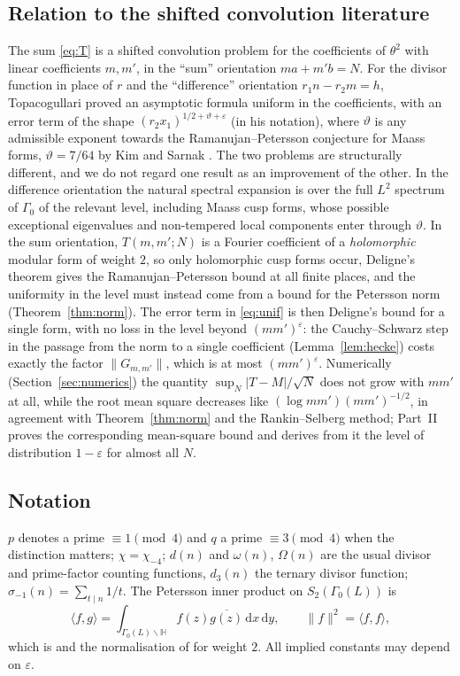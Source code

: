 \documentclass[11pt]{amsart}
\theoremstyle{remark}
\newcommand{\HH}{\mathbb{H}}
\newcommand{\e}{\varepsilon}
\newcommand{\dd}{\mathrm{d}}
\begin{document}
\subsection*{Relation to the shifted convolution literature}
The sum \eqref{eq:T} is a shifted convolution problem for the coefficients of $\theta^2$ with linear coefficients $m,m'$, in the ``sum'' orientation $ma+m'b=N$. For the divisor function in place of $r$ and the ``difference'' orientation $r_1n-r_2m=h$, Topacogullari \cite{Top} proved an asymptotic formula uniform in the coefficients, with an error term of the shape $(r_2x_1)^{1/2+\vartheta+\e}$ (in his notation), where $\vartheta$ is any admissible exponent towards the Ramanujan--Petersson conjecture for Maass forms, $\vartheta=7/64$ by Kim and Sarnak \cite{KimSarnak}. The two problems are structurally different, and we do not regard one result as an improvement of the other. In the difference orientation the natural spectral expansion is over the full $L^2$ spectrum of $\Gamma_0$ of the relevant level, including Maass cusp forms, whose possible exceptional eigenvalues and non-tempered local components enter through $\vartheta$. In the sum orientation, $T(m,m';N)$ is a Fourier coefficient of a \emph{holomorphic} modular form of weight $2$, so only holomorphic cusp forms occur, Deligne's theorem gives the Ramanujan--Petersson bound at all finite places, and the uniformity in the level must instead come from a bound for the Petersson norm (Theorem~\ref{thm:norm}). The error term in \eqref{eq:unif} is then Deligne's bound for a single form, with no loss in the level beyond $(mm')^\e$: the Cauchy--Schwarz step in the passage from the norm to a single coefficient (Lemma~\ref{lem:hecke}) costs exactly the factor $\|G_{m,m'}\|$, which is at most $(mm')^\e$. Numerically (Section~\ref{sec:numerics}) the quantity $\sup_N|T-M|/\sqrt N$ does not grow with $mm'$ at all, while the root mean square decreases like $(\log mm')(mm')^{-1/2}$, in agreement with Theorem~\ref{thm:norm} and the Rankin--Selberg method; Part~II proves the corresponding mean-square bound and derives from it the level of distribution $1-\e$ for almost all $N$.

\subsection*{Notation}
$p$ denotes a prime $\equiv1\pmod4$ and $q$ a prime $\equiv3\pmod 4$ when the distinction matters; $\chi=\chi_{-4}$; $d(n)$ and $\omega(n)$, $\Omega(n)$ are the usual divisor and prime-factor counting functions, $d_3(n)$ the ternary divisor function; $\sigma_{-1}(n)=\sum_{t\mid n}1/t$. The Petersson inner product on $S_2(\Gamma_0(L))$ is
\begin{equation}\label{eq:pet}
\langle f,g\rangle=\int_{\Gamma_0(L)\backslash\HH}f(z)\overline{g(z)}\,\dd x\,\dd y,\qquad \|f\|^2=\langle f,f\rangle,
\end{equation}
which is \cite[(2.1)]{ILS} and the normalisation of \cite{Waibel} for weight $2$. All implied constants may depend on $\e$.
\end{document}
